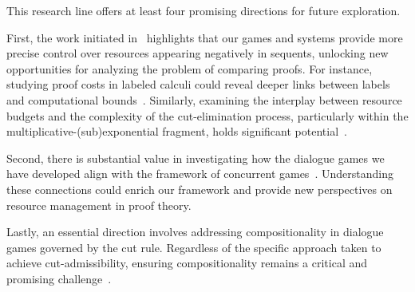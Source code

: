 
This research line offers at least four promising directions for future exploration.

First, the work initiated in~\cite{DBLP:conf/tableaux/LangOPF19} highlights that our games and systems provide more precise control over resources appearing negatively in sequents, unlocking new opportunities for analyzing the problem of comparing proofs. For instance, studying proof costs in labeled calculi could reveal deeper links between labels and computational bounds~\cite{DBLP:journals/jfp/AccattoliGK20}. Similarly, examining the interplay between resource budgets and the complexity of the cut-elimination process, particularly within the multiplicative-(sub)exponential fragment, holds significant potential~\cite{DBLP:journals/tcs/Strassburger03,DBLP:journals/tocl/StrassburgerG11}.

Second, there is substantial value in investigating how the dialogue games we have developed align with the framework of concurrent games~\cite{DBLP:conf/lics/AbramskyM99,DBLP:conf/lics/FaggianM05,DBLP:journals/lmcs/CastellanCRW17}. Understanding these connections could enrich our framework and provide new perspectives on resource management in proof theory.


Lastly, an essential direction involves addressing compositionality in dialogue games governed by the cut rule. Regardless of the specific approach taken to achieve cut-admissibility, ensuring compositionality remains a critical and promising challenge~\cite{dutilh18}.
